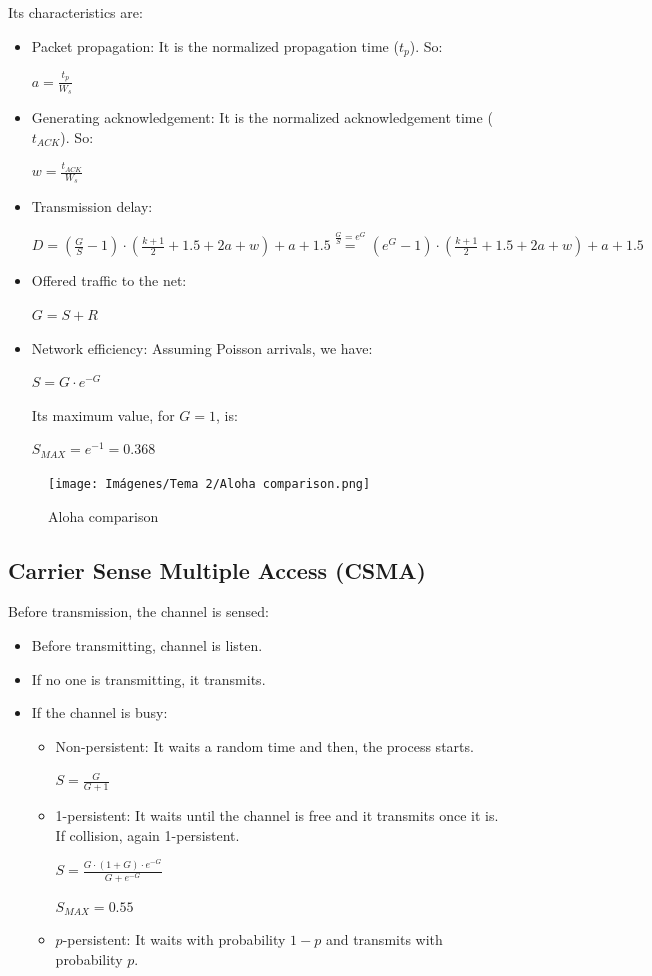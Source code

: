 \documentclass[
	12pt,
	twoside
]{book}
\begin{document}
Its characteristics are:

\begin{itemize}
	\item {
		Packet propagation: It is the normalized propagation time ($t_p$). So:

		$
			a = \frac {t_p} {W_s}
		$
	}
	\item {
		Generating acknowledgement: It is the normalized acknowledgement time ($t_{ACK}$). So:

		$
			w = \frac {t_{ACK}} {W_s}
		$
	}
	\item {
		Transmission delay:

		$
			D =
			\left( \frac {G} {S} - 1 \right) \cdot \left( \frac {k+1} {2} + 1.5 + 2a + w \right) + a + 1.5 \overset{\frac {G} {S} = e^G}{=}
			\left( e^G - 1 \right) \cdot \left( \frac {k+1} {2} + 1.5 + 2a + w \right) + a + 1.5
		$
	}
	\item {
		Offered traffic to the net:

		$
			G = S + R
		$
	}
	\item {
		Network efficiency: Assuming Poisson arrivals, we have:

		$
			S = G \cdot e^{-G}
		$

		Its maximum value, for $G = 1$, is:

		$
			S_{MAX} = e^{-1} = 0.368
		$
	}
\end{itemize}

\begin{figure}[H]
	\centering
	\texttt{[image: Imágenes/Tema 2/Aloha comparison.png]}
	\caption{
		\label{fig:unit2_aloha_comp}
		Aloha comparison
	}
\end{figure}

\subsection{Carrier Sense Multiple Access (CSMA)}

Before transmission, the channel is sensed:

\begin{itemize}
	\item Before transmitting, channel is listen.
	\item If no one is transmitting, it transmits.
	\item {
		If the channel is busy:
		\begin{itemize}
			\item {
				Non-persistent: It waits a random time and then, the process starts.

				$
					S = \frac {G} {G+1}
				$
			}
			\item {
				1-persistent: It waits until the channel is free and it transmits once it is. If collision, again 1-persistent.

				$
					S = \frac {G \cdot (1 + G) \cdot e^{-G}} {G + e^{-G}}
				$

				$
					S_{MAX} = 0.55
				$
			}
			\item $p$-persistent: It waits with probability $1 - p$ and transmits with probability $p$.
		\end{itemize}
	}
\end{itemize}
\end{document}
